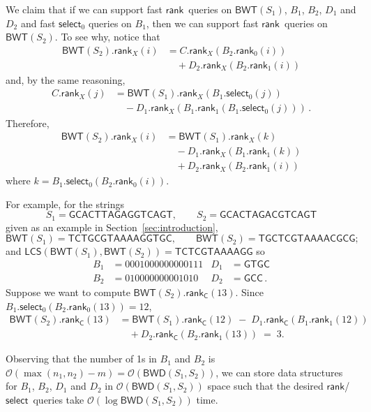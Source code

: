 \documentclass{llncs}
\newcommand{\Oh}[1]
  {\ensuremath{\mathcal{O}\!\left( {#1} \right)}}
\newcommand{\LCS}
  {\ensuremath{\mathsf{LCS}}}
\newcommand{\BWD}
  {\ensuremath{\mathsf{BWD}}}
\newcommand{\BWT}
  {\ensuremath{\mathsf{BWT}}}
\newcommand{\rank}
  {\ensuremath{\mathsf{rank}}}
\newcommand{\select}
  {\ensuremath{\mathsf{select}}}
\begin{document}
We claim that if we can support fast \rank\ queries on \(\BWT (S_1)\), $B_1$,
$B_2$, $D_1$ and $D_2$ and fast $\select_0$ queries on $B_1$, then we can
support fast \rank\ queries on \(\BWT (S_2)\). To see why, notice that
\begin{align*}
\BWT (S_2).\rank_X (i)
& = C.\rank_X (B_2.\rank_0 (i))\\
& \quad + D_2.\rank_X (B_2.\rank_1 (i))
\end{align*}
and, by the same reasoning,
\begin{align*}
C.\rank_X (j)
& = \BWT (S_1).\rank_X (B_1.\select_0 (j))\\
& \quad - D_1.\rank_X (B_1.\rank_1 (B_1.\select_0 (j)))\,.
\end{align*}
Therefore,
\begin{align*}
\BWT (S_2).\rank_X (i)
& = \BWT (S_1).\rank_X (k)\\
& \quad - D_1.\rank_X (B_1.\rank_1 (k))\\
& \quad + D_2.\rank_X (B_2.\rank_1 (i))
\end{align*}
where \(k = B_1.\select_0 (B_2.\rank_0 (i))\).


For example, for the strings
$$
S_1 = \mathsf{GCACTTAGAGGTCAGT},\qquad
S_2 = \mathsf{GCACTAGACGTCAGT}
$$
given as an example in Section~\ref{sec:introduction},
$$
\BWT (S_1) = \mathsf{TCTGCGTAAAAGGTGC},\qquad
\BWT (S_2) = \mathsf{TGCTCGTAAAACGCG};
$$
and $\LCS(\BWT (S_1),\BWT (S_2)) = \mathsf{TCTCGTAAAAGG}$ so
\begin{align*}
B_1  & = 0001000000000111  & D_1  &= \mathsf{GTGC}\\
B_2  & = 010000000001010   & D_2  & = \mathsf{GCC}\,.
\end{align*}
Suppose we want to compute $\BWT (S_2).\rank_\mathsf{C} (13)$. Since \(B_1.\select_0 (B_2.\rank_0 (13)) = 12\),
\begin{align*}
\BWT (S_2).\rank_\mathsf{C} (13)
& = \BWT (S_1).\rank_\mathsf{C} (12)\; -\; D_1.\rank_\mathsf{C} (B_1.\rank_1 (12))
\\
& \quad + D_2.\rank_\mathsf{C} (B_2.\rank_1 (13)) \;=\; 3.
\end{align*}

Observing that the number of 1s in $B_1$ and $B_2$ is \(\Oh{\max (n_1, n_2) - m}
= \Oh{\BWD (S_1, S_2)}\), we can store data structures for $B_1$,
$B_2$, $D_1$ and $D_2$ in $\Oh{\BWD (S_1, S_2)}$ space such that the desired
\rank/\select\ queries take $\Oh{\log \BWD (S_1, S_2)}$ time.
\end{document}
